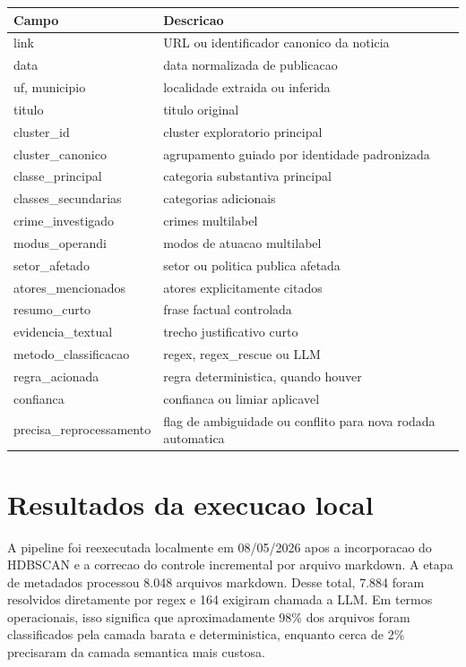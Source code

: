 \documentclass[12pt]{article}
\begin{document}
\begin{longtable}{ll}
\toprule
Campo & Descricao \\
\midrule
\endhead
link & URL ou identificador canonico da noticia \\
data & data normalizada de publicacao \\
uf, municipio & localidade extraida ou inferida \\
titulo & titulo original \\
cluster\_id & cluster exploratorio principal \\
cluster\_canonico & agrupamento guiado por identidade padronizada \\
classe\_principal & categoria substantiva principal \\
classes\_secundarias & categorias adicionais \\
crime\_investigado & crimes multilabel \\
modus\_operandi & modos de atuacao multilabel \\
setor\_afetado & setor ou politica publica afetada \\
atores\_mencionados & atores explicitamente citados \\
resumo\_curto & frase factual controlada \\
evidencia\_textual & trecho justificativo curto \\
metodo\_classificacao & regex, regex\_rescue ou LLM \\
regra\_acionada & regra deterministica, quando houver \\
confianca & confianca ou limiar aplicavel \\
precisa\_reprocessamento & flag de ambiguidade ou conflito para nova rodada automatica \\
\bottomrule
\end{longtable}

\section{Resultados da execucao local}

A pipeline foi reexecutada localmente em 08/05/2026 apos a incorporacao do HDBSCAN e a correcao do controle incremental por arquivo markdown. A etapa de metadados processou 8.048 arquivos markdown. Desse total, 7.884 foram resolvidos diretamente por regex e 164 exigiram chamada a LLM. Em termos operacionais, isso significa que aproximadamente 98\% dos arquivos foram classificados pela camada barata e deterministica, enquanto cerca de 2\% precisaram da camada semantica mais custosa.
\end{document}
